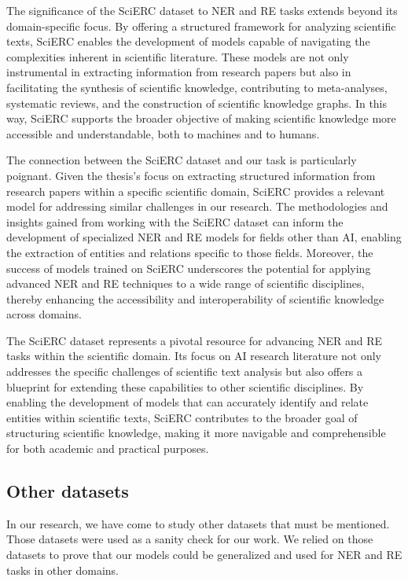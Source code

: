 The significance of the SciERC dataset to NER and RE tasks extends beyond its domain-specific focus. By offering a structured framework for analyzing scientific texts, SciERC enables the development of models capable of navigating the complexities inherent in scientific literature. These models are not only instrumental in extracting information from research papers but also in facilitating the synthesis of scientific knowledge, contributing to meta-analyses, systematic reviews, and the construction of scientific knowledge graphs. In this way, SciERC supports the broader objective of making scientific knowledge more accessible and understandable, both to machines and to humans.

The connection between the SciERC dataset and our task is particularly poignant. Given the thesis's focus on extracting structured information from research papers within a specific scientific domain, SciERC provides a relevant model for addressing similar challenges in our research. The methodologies and insights gained from working with the SciERC dataset can inform the development of specialized NER and RE models for fields other than AI, enabling the extraction of entities and relations specific to those fields. Moreover, the success of models trained on SciERC underscores the potential for applying advanced NER and RE techniques to a wide range of scientific disciplines, thereby enhancing the accessibility and interoperability of scientific knowledge across domains.

The SciERC dataset represents a pivotal resource for advancing NER and RE tasks within the scientific domain. Its focus on AI research literature not only addresses the specific challenges of scientific text analysis but also offers a blueprint for extending these capabilities to other scientific disciplines. By enabling the development of models that can accurately identify and relate entities within scientific texts, SciERC contributes to the broader goal of structuring scientific knowledge, making it more navigable and comprehensible for both academic and practical purposes.
\subsection{Other datasets}
\label{sec:otherdataset}
In our research, we have come to study other datasets that must be mentioned. Those datasets were used as a sanity check for our work. We relied on those datasets to prove that our models could be generalized and used for NER and RE tasks in other domains.
